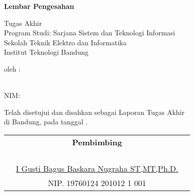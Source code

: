 \clearpage
\pagestyle{empty}

\begin{center}
\smallskip

    {\Large \bfseries Lembar Pengesahan}

    \MakeUppercase{\normalsize \bfseries \thetitle}
    \vfill

    \normalsize Tugas Akhir \\
    Program Studi: Sarjana Sistem dan Teknologi Informasi \\
    Sekolah Teknik Elektro dan Informatika \\
    Institut Teknologi Bandung \\
    \vfill

    \normalsize oleh :

    \normalsize \theauthor \\
    \normalsize NIM: \nim

    \vfill
    \normalsize \normalfont
    Telah disetujui dan disahkan sebagai Laporan Tugas Akhir \\
    di Bandung, pada tanggal \thedate{} \yearsidang{}.

    \vfill
    \setlength{\tabcolsep}{12pt}
    \begin{tabularx}{\textwidth}{c@{\hskip 0.2\textwidth}cc@{\hskip 0.3\textwidth}}
        & {\bfseries Pembimbing} & \\
        & & \\
        & & \\
        & & \\
        & & \\
        & \underline{I Gusti Bagus Baskara Nugraha ST,MT,Ph.D.} & \\
        & NIP. 19760124 201012 1 001 & 
    \end{tabularx}

\end{center}
\clearpage
